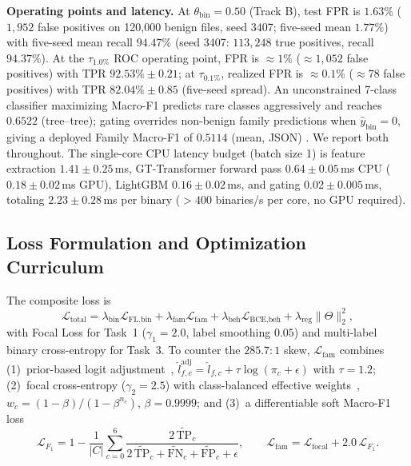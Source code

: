 \documentclass[Number]{sn-jnl}
\begin{document}
\noindent\textbf{Operating points and latency.}
At $\theta_\text{bin}=0.50$ (Track B), test FPR is $1.63\%$ ($1{,}952$ false positives on 120{,}000 benign files, seed 3407; five-seed mean $1.77\%$) with five-seed mean recall $94.47\%$ (seed 3407: $113{,}248$ true positives, recall $94.37\%$). At the $\tau_{1.0\%}$ ROC operating point, FPR is $\approx1\%$ ($\approx1{,}052$ false positives) with TPR $92.53\%\pm0.21$; at $\tau_{0.1\%}$, realized FPR is $\approx0.1\%$ ($\approx78$ false positives) with TPR $82.04\%\pm0.85$ (five-seed spread). An unconstrained 7-class classifier maximizing Macro-F1 predicts rare classes aggressively and reaches $0.6522$ (tree--tree); gating overrides non-benign family predictions when $\hat{y}_\text{bin}=0$, giving a deployed Family Macro-F1 of $0.5114$ (mean, JSON) . We report both throughout. The single-core CPU latency budget (batch size 1) is feature extraction $1.41\pm0.25$\,ms, GT-Transformer forward pass $0.64\pm0.05$\,ms CPU ($0.18\pm0.02$\,ms GPU), LightGBM $0.16\pm0.02$\,ms, and gating $0.02\pm0.005$\,ms, totaling $2.23\pm0.28$\,ms per binary ($>400$ binaries/s per core, no GPU required).

\subsection{Loss Formulation and Optimization Curriculum}\label{subsec:training}

The composite loss is
\begin{equation}
  \mathcal{L}_\text{total} = \lambda_\text{bin}\mathcal{L}_\text{FL,bin} + \lambda_\text{fam}\mathcal{L}_\text{fam} + \lambda_\text{beh}\mathcal{L}_\text{BCE,beh} + \lambda_\text{reg}\|\Theta\|_2^2,
  \label{eq:composite_loss}
\end{equation}
with Focal Loss for Task~1 ($\gamma_1=2.0$, label smoothing $0.05$) and multi-label binary cross-entropy for Task~3. To counter the $285.7{:}1$ skew, $\mathcal{L}_\text{fam}$ combines (1)~prior-based logit adjustment~\cite{menon2021long}, $\hat{l}_{f,c}^\text{adj}=\hat{l}_{f,c}+\tau\log(\pi_c+\epsilon)$ with $\tau=1.2$; (2)~focal cross-entropy ($\gamma_2=2.5$) with class-balanced effective weights~\cite{cui2019class}, $w_c=(1-\beta)/(1-\beta^{n_c})$, $\beta=0.9999$; and (3)~a differentiable soft Macro-F1 loss
\begin{equation}
  \mathcal{L}_{F_1} = 1 - \frac{1}{|C|}\sum_{c=0}^6 \frac{2\,\widetilde{\mathrm{TP}}_c}{2\,\widetilde{\mathrm{TP}}_c + \widetilde{\mathrm{FN}}_c + \widetilde{\mathrm{FP}}_c + \epsilon},\qquad \mathcal{L}_\text{fam}=\mathcal{L}_\text{focal}+2.0\,\mathcal{L}_{F_1}.
\end{equation}
\end{document}
